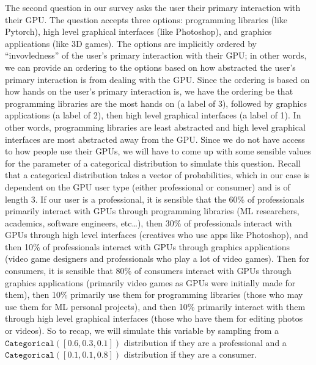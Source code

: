 \documentclass[
]{article}
\begin{document}
The second question in our survey asks the user their primary
interaction with their GPU. The question accepts three options:
programming libraries (like Pytorch), high level graphical interfaces
(like Photoshop), and graphics applications (like 3D games). The options
are implicitly ordered by ``invovledness'' of the user's primary
interaction with their GPU; in other words, we can provide an ordering
to the options based on how abstracted the user's primary interaction is
from dealing with the GPU. Since the ordering is based on how hands on
the user's primary interaction is, we have the ordering be that
programming libraries are the most hands on (a label of 3), followed by
graphics applications (a label of 2), then high level graphical
interfaces (a label of 1). In other words, programming libraries are
least abstracted and high level graphical interfaces are most abstracted
away from the GPU. Since we do not have access to how people use their
GPUs, we will have to come up with some sensible values for the
parameter of a categorical distribution to simulate this question.
Recall that a categorical distribution takes a vector of probabilities,
which in our case is dependent on the GPU user type (either professional
or consumer) and is of length 3. If our user is a professional, it is
sensible that the 60\% of professionals primarily interact with GPUs
through programming libraries (ML researchers, academics, software
engineers, etc\ldots), then 30\% of professionals interact with GPUs
through high level interfaces (creatives who use apps like Photoshop),
and then 10\% of professionals interact with GPUs through graphics
applications (video game designers and professionals who play a lot of
video games). Then for consumers, it is sensible that 80\% of consumers
interact with GPUs through graphics applications (primarily video games
as GPUs were initially made for them), then 10\% primarily use them for
programming libraries (those who may use them for ML personal projects),
and then 10\% primarily interact with them through high level graphical
interfaces (those who have them for editing photos or videos). So to
recap, we will simulate this variable by sampling from a
\(\texttt{Categorical}([0.6, 0.3, 0.1])\) distribution if they are a
professional and a \(\texttt{Categorical}([0.1, 0.1, 0.8])\)
distribution if they are a consumer.
\end{document}
